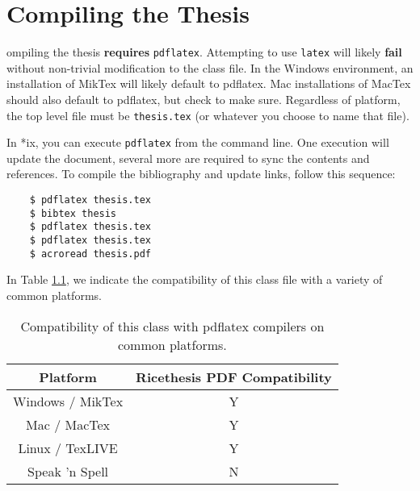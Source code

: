 \chapter{Compiling the Thesis}
\label{chap:compiling}

ompiling the thesis \textbf{requires} \verb+pdflatex+.  Attempting to use \verb+latex+ will likely \textbf{fail} without non-trivial modification to the class file.  In the Windows environment, an installation of MikTex will likely default to pdflatex.  Mac installations of MacTex should also default to pdflatex, but check to make sure.  Regardless of platform, the top level file must be \verb+thesis.tex+ (or whatever you choose to name that file).

In *ix, you can execute \verb+pdflatex+ from the command line.  One execution will update the document, several more are required to sync the contents and references.  To compile the bibliography and update links, follow this sequence:

\singlespacing
\begin{verbatim}
	$ pdflatex thesis.tex
	$ bibtex thesis
	$ pdflatex thesis.tex
	$ pdflatex thesis.tex
	$ acroread thesis.pdf
\end{verbatim}
\doublespacing

In Table \ref{tab:compatibility}, we indicate the compatibility of this class file with a variety of common platforms.

\begin{table}[ht]
	\centering
	\begin{tabular}{|c||c|}
		\hline Platform & Ricethesis PDF Compatibility\\
		\hline \hline Windows / MikTex & Y \\
		\hline Mac / MacTex & Y\\
		\hline Linux / TexLIVE & Y \\
		\hline Speak 'n Spell & N \\
		\hline
	\end{tabular}
	\caption[Compatibility Chart]{Compatibility of this class with pdflatex compilers on common platforms.}
	\label{tab:compatibility}
\end{table}

% 
